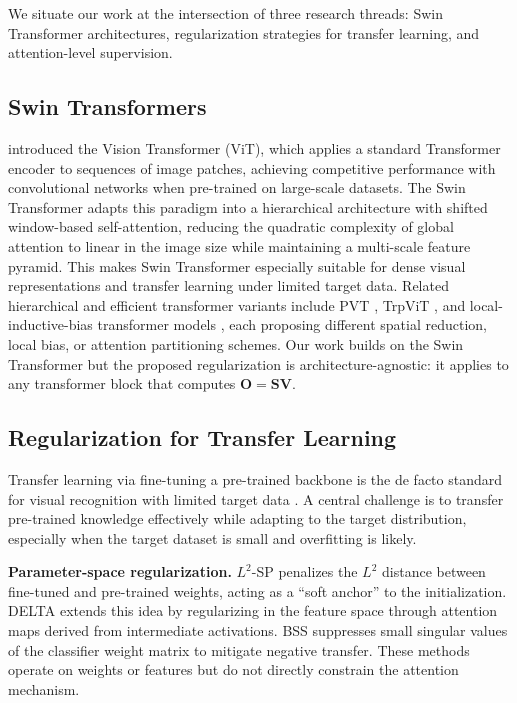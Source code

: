 \documentclass[review,12pt,authoryear]{elsarticle}
\begin{document}
We situate our work at the intersection of three research threads: Swin Transformer architectures, regularization strategies for transfer learning, and attention-level supervision.

\subsection{Swin Transformers}
\label{sec:related:vit}

\citet{dosovitskiy2021an} introduced the Vision Transformer (ViT), which applies a standard Transformer encoder \citep{vaswani2017attention} to sequences of image patches, achieving competitive performance with convolutional networks when pre-trained on large-scale datasets.
The Swin Transformer \citep{liu2021swin} adapts this paradigm into a hierarchical architecture with shifted window-based self-attention, reducing the quadratic complexity of global attention to linear in the image size while maintaining a multi-scale feature pyramid.
This makes Swin Transformer especially suitable for dense visual representations and transfer learning under limited target data.
Related hierarchical and efficient transformer variants include PVT \citep{wang2021pyramid}, TrpViT \citep{li2024trpvit}, and local-inductive-bias transformer models \citep{akkaya2024enhancing}, each proposing different spatial reduction, local bias, or attention partitioning schemes.
Our work builds on the Swin Transformer but the proposed regularization is architecture-agnostic: it applies to any transformer block that computes $\mathbf{O} = \mathbf{S}\mathbf{V}$.

\subsection{Regularization for Transfer Learning}
\label{sec:related:transfer}

Transfer learning via fine-tuning a pre-trained backbone is the de facto standard for visual recognition with limited target data \citep{zhuang2020comprehensive,akkaya2024enhancing}.
A central challenge is to transfer pre-trained knowledge effectively while adapting to the target distribution, especially when the target dataset is small and overfitting is likely.

\textbf{Parameter-space regularization.}
$L^2$-SP \citep{li2018explicit} penalizes the $L^2$ distance between fine-tuned and pre-trained weights, acting as a ``soft anchor'' to the initialization.
DELTA \citep{li2019delta} extends this idea by regularizing in the feature space through attention maps derived from intermediate activations.
BSS \citep{chen2019catastrophic} suppresses small singular values of the classifier weight matrix to mitigate negative transfer.
These methods operate on weights or features but do not directly constrain the attention mechanism.
\end{document}
